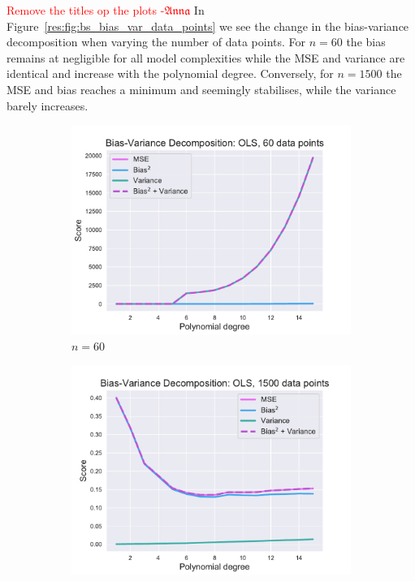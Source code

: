 \documentclass[twocolumn,english,notitlepage]{article}
\newcommand{\comment}[1]{\textcolor{red}{#1}}
\newcommand{\Anna}{$\mathfrak{Anna}$}
\begin{document}
            \comment{Remove the titles op the plots -\Anna}
            In Figure~\ref{res:fig:bs_bias_var_data_points} we see the change in the bias-variance decomposition when varying the number of data points. For $n=60$ the bias remains at negligible for all model complexities while the MSE and variance are identical and increase with the polynomial degree. Conversely, for $n=1500$ the MSE and bias reaches a minimum and seemingly stabilises, while the variance barely increases. 
            \begin{figure}[ht]
                \begin{subfigure}{.5\textwidth}
                    \centering
                    \includegraphics[width=\linewidth]{BS_Bias_var_decomp_OLS_60_data_points.pdf}
                    \caption{$n=60$}
                    \end{subfigure}
                \begin{subfigure}{.5\textwidth}
                    \centering
                    \includegraphics[width=\linewidth]{BS_Bias_var_decomp_OLS_1500_data_points.pdf}

\end{subfigure}
\end{figure}
\end{document}
